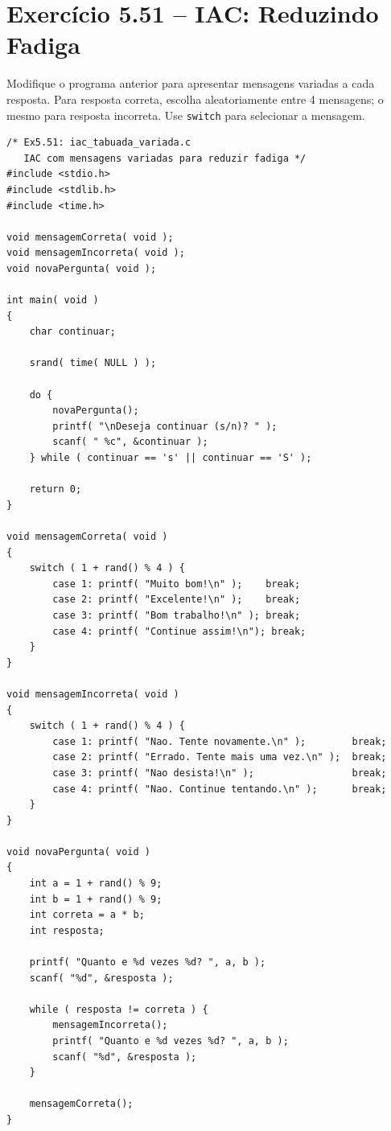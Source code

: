 \documentclass[12pt,a4paper]{article}
\begin{document}
\section{Exercício 5.51 -- IAC: Reduzindo Fadiga}

\begin{enunciadoBox}[Enunciado 5.51]
Modifique o programa anterior para apresentar mensagens variadas a cada resposta.
Para resposta correta, escolha aleatoriamente entre 4 mensagens; o mesmo para resposta
incorreta. Use \texttt{switch} para selecionar a mensagem.
\end{enunciadoBox}

\begin{respostabox}
\begin{lstlisting}
/* Ex5.51: iac_tabuada_variada.c
   IAC com mensagens variadas para reduzir fadiga */
#include <stdio.h>
#include <stdlib.h>
#include <time.h>

void mensagemCorreta( void );
void mensagemIncorreta( void );
void novaPergunta( void );

int main( void )
{
    char continuar;

    srand( time( NULL ) );

    do {
        novaPergunta();
        printf( "\nDeseja continuar (s/n)? " );
        scanf( " %c", &continuar );
    } while ( continuar == 's' || continuar == 'S' );

    return 0;
}

void mensagemCorreta( void )
{
    switch ( 1 + rand() % 4 ) {
        case 1: printf( "Muito bom!\n" );    break;
        case 2: printf( "Excelente!\n" );    break;
        case 3: printf( "Bom trabalho!\n" ); break;
        case 4: printf( "Continue assim!\n"); break;
    }
}

void mensagemIncorreta( void )
{
    switch ( 1 + rand() % 4 ) {
        case 1: printf( "Nao. Tente novamente.\n" );        break;
        case 2: printf( "Errado. Tente mais uma vez.\n" );  break;
        case 3: printf( "Nao desista!\n" );                 break;
        case 4: printf( "Nao. Continue tentando.\n" );      break;
    }
}

void novaPergunta( void )
{
    int a = 1 + rand() % 9;
    int b = 1 + rand() % 9;
    int correta = a * b;
    int resposta;

    printf( "Quanto e %d vezes %d? ", a, b );
    scanf( "%d", &resposta );

    while ( resposta != correta ) {
        mensagemIncorreta();
        printf( "Quanto e %d vezes %d? ", a, b );
        scanf( "%d", &resposta );
    }

    mensagemCorreta();
}
\end{lstlisting}
\end{respostabox}
\end{document}
